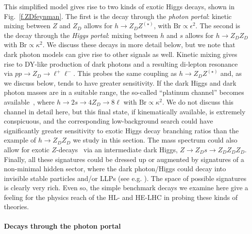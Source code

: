 This simplified model gives rise to two kinds of exotic Higgs decays, shown in Fig.~\ref{f.ZDfeynman}. The first is the decay through the \emph{photon portal}: kinetic mixing between $Z$ and $Z_D$ allows for $h\to Z_D Z^{(\star)}$, with $\mathrm{Br} \propto \epsilon^2$. The second is the decay through the \emph{Higgs portal}: mixing between $h$ and $s$ allows for $h \to Z_D Z_D$ with $\mathrm{Br} \propto \kappa^2$. We discuss these decays in more detail below, but we note that dark photon models can give rise to other signals as well. 
%
Kinetic mixing gives rise to DY-like production of dark photons and a resulting di-lepton resonance via $p p \to Z_D \to \ell^+ \ell^-$. This probes the same coupling as $h \to Z_D Z^{(\star)}$ and, as we discuss below, tends to have greater sensitivity. 
%
If the dark Higgs and dark photon masses are in a suitable range, the so-called ``platinum channel'' becomes available~\cite{Izaguirre:2018atq}, where $h \to 2s \to 4 Z_D \to 8 \ell$ with $\mathrm{Br} \propto \kappa^2$. We do not discuss this channel in detail here, but this final state, if kinematically available, is extremely conspicuous, and the corresponding low-background search could have significantly greater sensitivity to exotic Higgs decay branching ratios than the example of $h \to Z_D Z_D$ we study in this section. 
%
The mass spectrum could also allow for exotic $Z$-decays~\cite{Blinov:2017dtk} via an intermediate dark Higgs, $Z \to Z_D s \to Z_D Z_D Z_D$. 
%
Finally, all these signatures could be dressed up or augmented by signatures of a non-minimal hidden sector, where the dark photon/Higgs could decay into invisible stable particles and/or LLPs (see e.g. \cite{Alexander:2016aln, Curtin:2018mvb}).
%
The space of possible signatures is clearly very rich. Even so, the simple benchmark decays we examine here give a feeling for the physics reach of the HL- and HE-LHC in probing these kinds of theories. 

\bigskip

\paragraph{Decays through the photon portal}


